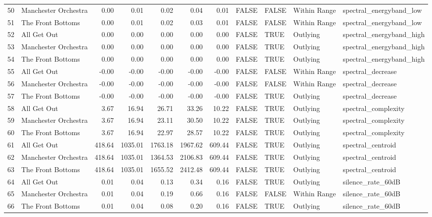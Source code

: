 \begin{table}[ht]
\begin{tabular}{rlrrrrrllll}
  50 & Manchester Orchestra & 0.00 & 0.01 & 0.02 & 0.04 & 0.01 & FALSE & FALSE & Within Range & spectral\_energyband\_low \\ 
  51 & The Front Bottoms & 0.00 & 0.01 & 0.02 & 0.03 & 0.01 & FALSE & FALSE & Within Range & spectral\_energyband\_low \\ 
  52 & All Get Out & 0.00 & 0.00 & 0.00 & 0.00 & 0.00 & FALSE & TRUE & Outlying & spectral\_energyband\_high \\ 
  53 & Manchester Orchestra & 0.00 & 0.00 & 0.00 & 0.00 & 0.00 & FALSE & TRUE & Outlying & spectral\_energyband\_high \\ 
  54 & The Front Bottoms & 0.00 & 0.00 & 0.00 & 0.00 & 0.00 & FALSE & TRUE & Outlying & spectral\_energyband\_high \\ 
  55 & All Get Out & -0.00 & -0.00 & -0.00 & -0.00 & -0.00 & FALSE & FALSE & Within Range & spectral\_decrease \\ 
  56 & Manchester Orchestra & -0.00 & -0.00 & -0.00 & -0.00 & -0.00 & FALSE & FALSE & Within Range & spectral\_decrease \\ 
  57 & The Front Bottoms & -0.00 & -0.00 & -0.00 & -0.00 & -0.00 & FALSE & TRUE & Outlying & spectral\_decrease \\ 
  58 & All Get Out & 3.67 & 16.94 & 26.71 & 33.26 & 10.22 & FALSE & TRUE & Outlying & spectral\_complexity \\ 
  59 & Manchester Orchestra & 3.67 & 16.94 & 23.11 & 30.50 & 10.22 & FALSE & TRUE & Outlying & spectral\_complexity \\ 
  60 & The Front Bottoms & 3.67 & 16.94 & 22.97 & 28.57 & 10.22 & FALSE & TRUE & Outlying & spectral\_complexity \\ 
  61 & All Get Out & 418.64 & 1035.01 & 1763.18 & 1967.62 & 609.44 & FALSE & TRUE & Outlying & spectral\_centroid \\ 
  62 & Manchester Orchestra & 418.64 & 1035.01 & 1364.53 & 2106.83 & 609.44 & FALSE & TRUE & Outlying & spectral\_centroid \\ 
  63 & The Front Bottoms & 418.64 & 1035.01 & 1655.52 & 2412.48 & 609.44 & FALSE & TRUE & Outlying & spectral\_centroid \\ 
  64 & All Get Out & 0.01 & 0.04 & 0.13 & 0.34 & 0.16 & FALSE & TRUE & Outlying & silence\_rate\_60dB \\ 
  65 & Manchester Orchestra & 0.01 & 0.04 & 0.19 & 0.66 & 0.16 & FALSE & FALSE & Within Range & silence\_rate\_60dB \\ 
  66 & The Front Bottoms & 0.01 & 0.04 & 0.08 & 0.20 & 0.16 & FALSE & TRUE & Outlying & silence\_rate\_60dB \\ 

\end{tabular}
\end{table}
